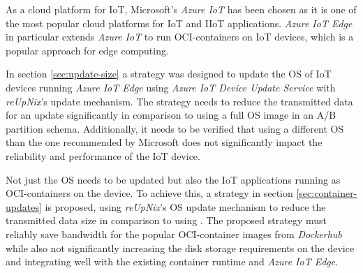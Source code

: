 As a cloud platform for \ac{IoT}, Microsoft's \textit{Azure IoT} has been chosen
as it is one of the most popular cloud platforms for \ac{IoT} and \ac{IIoT} applications.
\textit{Azure IoT Edge} in particular extends \textit{Azure IoT} to run
\ac{OCI}-containers on \ac{IoT} devices, which is a popular approach for edge
computing.

In section \ref{sec:update-size} a strategy was designed to update the \ac{OS} of \ac{IoT} devices
running \textit{Azure IoT Edge} using \textit{Azure IoT Device Update Service} with
\textit{reUpNix}'s update mechanism. The strategy needs to reduce the transmitted data
for an update significantly in comparison to using a full \ac{OS} image in an
A/B partition schema. Additionally, it needs to be verified that using a different
\ac{OS} than the one recommended by Microsoft does not significantly impact
the reliability and performance of the \ac{IoT} device.


Not just the \ac{OS} needs to be updated but also the \ac{IoT} applications
running as \ac{OCI}-containers on the device. To achieve this,
a strategy in section \ref{sec:container-updates} is proposed,
using \textit{reUpNix}'s \ac{OS} update mechanism to reduce the transmitted data
size in comparison to using . The proposed strategy must
reliably save bandwidth for the popular \ac{OCI}-container images from
\textit{Dockerhub} while also not significantly increasing the disk storage
requirements on the device and integrating well with the existing container
runtime and \textit{Azure IoT Edge}.

